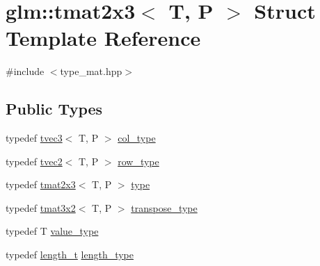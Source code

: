 \hypertarget{structglm_1_1tmat2x3}{}\section{glm\+::tmat2x3$<$ T, P $>$ Struct Template Reference}
\label{structglm_1_1tmat2x3}


{\ttfamily \#include $<$type\+\_\+mat.\+hpp$>$}

\subsection*{Public Types}
\begin{DoxyCompactItemize}
\item 
typedef \mbox{\hyperlink{structglm_1_1tvec3}{tvec3}}$<$ T, P $>$ \mbox{\hyperlink{structglm_1_1tmat2x3_a62523fc3d245c37e15d68c3b9729f366}{col\+\_\+type}}
\item 
typedef \mbox{\hyperlink{structglm_1_1tvec2}{tvec2}}$<$ T, P $>$ \mbox{\hyperlink{structglm_1_1tmat2x3_a0cce885b1659b852ff0290413ce02238}{row\+\_\+type}}
\item 
typedef \mbox{\hyperlink{structglm_1_1tmat2x3}{tmat2x3}}$<$ T, P $>$ \mbox{\hyperlink{structglm_1_1tmat2x3_af35f08ee62979a5e377b5f5262c57937}{type}}
\item 
typedef \mbox{\hyperlink{structglm_1_1tmat3x2}{tmat3x2}}$<$ T, P $>$ \mbox{\hyperlink{structglm_1_1tmat2x3_adade07dec727cac2e2463d8c765f133d}{transpose\+\_\+type}}
\item 
typedef T \mbox{\hyperlink{structglm_1_1tmat2x3_a73172253a573f98aa06474e043cc03af}{value\+\_\+type}}
\item 
typedef \mbox{\hyperlink{namespaceglm_a090a0de2260835bee80e71a702492ed9}{length\+\_\+t}} \mbox{\hyperlink{structglm_1_1tmat2x3_a25be85bf523cf3daa1c2b6b00ad45c82}{length\+\_\+type}}
\end{DoxyCompactItemize}
